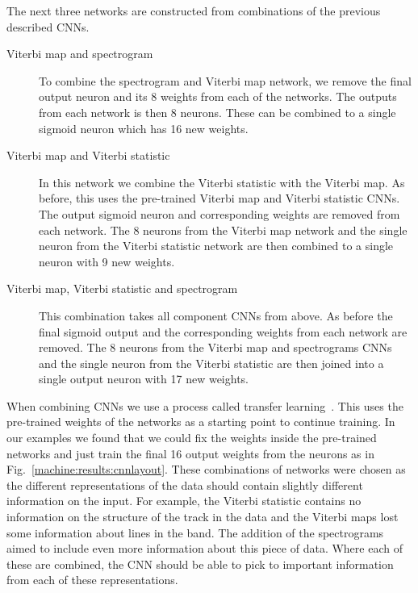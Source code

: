 The next three networks are constructed from combinations of the previous described \glspl{CNN}.

\begin{description}
	\item [Viterbi map and spectrogram] To combine the spectrogram and Viterbi map network, we remove the final output neuron and its 8 weights from each of the networks. 
	The outputs from each network is then 8 neurons. These can be combined to a single sigmoid neuron which has 16 new weights.
	
	\item [Viterbi map and Viterbi statistic] In this network we combine the
	Viterbi statistic with the Viterbi map. As before, this uses the pre-trained
	Viterbi map and Viterbi statistic \glspl{CNN}. The output sigmoid neuron and corresponding weights are removed from each network. 
	The 8 neurons from the Viterbi map network and the single neuron from the Viterbi statistic network are then combined to a single neuron with 9 new weights.
	
	\item [Viterbi map, Viterbi statistic and spectrogram] This combination takes all component \glspl{CNN} from above. As before the final sigmoid output and the corresponding weights from each network are removed.
	The 8 neurons from the Viterbi map and spectrograms \glspl{CNN} and the single neuron from the Viterbi statistic are then joined into a single output neuron with 17 new weights. 
	
\end{description}

When combining \glspl{CNN} we use a process called transfer
learning~\cite{prattDiscriminabilityBasedTransfer}. This uses the pre-trained weights of the networks as a starting point to continue training. 
In our examples we found that we could fix the weights inside the pre-trained networks and just train the final 16 output weights from the neurons as in Fig.~\ref{machine:results:cnnlayout}.
These combinations of networks were chosen as the different representations of the data should contain slightly different information on the input.
For example, the Viterbi statistic contains no information on the structure of the track in the data and the Viterbi maps lost some information about lines in the band.
The addition of the spectrograms aimed to include even more information about this piece of data. 
Where each of these are combined, the \gls{CNN} should be able to pick to important information from each of these representations.

